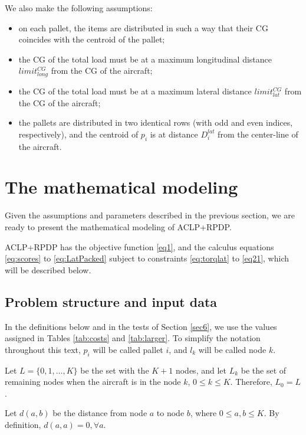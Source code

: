 \documentclass[preprint]{elsarticle}
\begin{document}
\vspace{3mm}
We also make the following assumptions:
\begin{itemize}
	\item on each pallet, the items are distributed in such a way that their CG coincides with the centroid of the pallet;
	\item the CG of the total load must be at a maximum longitudinal distance $limit^{CG}_{long}$\/ from the CG of the aircraft;
	\item the CG of the total load must be at a maximum lateral distance $limit^{CG}_{lat}$\/ from the CG of the aircraft;
	\item the pallets are distributed in two identical rows (with odd and even indices, respectively), and the centroid of $p_i$\/ is at distance $D^{lat}_{i}$\/ from the center-line of the aircraft.
\end{itemize}



\section{The mathematical modeling}
\label{sec4}

Given the assumptions and parameters described in the previous section, we are ready to present the mathematical modeling of ACLP+RPDP. 

ACLP+RPDP has the objective function \ref{eq1}, and the calculus equations \ref{eq:scores} to \ref{eq:LatPacked} subject to constraints \ref{eq:torqlat} to \ref{eq21}, which will be described below. 

\subsection{Problem structure and input data}

In the definitions below and in the tests of Section \ref{sec6}, we use the values assigned in Tables \ref{tab:costs} and \ref{tab:larger}. To simplify the notation throughout this text, $p_i$\/ will be called pallet $i$, and $l_k$\/ will be called node $k$.

Let $L = \{ 0, 1, \ldots, K \}$ be the set with the $K+1$\/ nodes, and let $L_k$\/ be the set of remaining nodes when the aircraft is in the node $k$, $0 \leq k \leq K$. Therefore, $L_0 = L$.

Let $d(a,b)$ be the distance from node $a$\/ to node $b$, where $0 \leq a, b \leq K$. By definition, $d(a,a) = 0, \forall a$.
\end{document}
